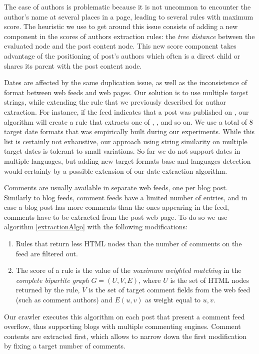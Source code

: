 The case of authors is problematic because it is not uncommon to encounter the author's name at several places in a page, leading to several rules with maximum score. The heuristic we use to get around this issue consists of adding a new component in the scores of authors extraction rules: the \emph{tree distance} between the evaluated node and the post content node. This new score component takes advantage of the positioning of post's authors which often is a direct child or shares its parent with the post content node.

Dates are affected by the same duplication issue, as well as the inconsistence of format between web feeds and web pages. Our solution is to use multiple \emph{target} strings, while extending the rule that we previously described for author extraction. For instance, if the feed indicates that a post was published on
, our algorithm will create a rule that extracts one of , ,  and so on. We use a total of 8 target date formats that was empirically built during our experiments. While this list is certainly not exhaustive, our approach using string similarity on multiple target dates is tolerant to small variations. So far we do not support dates in multiple languages, but adding new target formats base and languages detection would certainly by a possible extension of our date extraction algorithm.

Comments are usually available in separate web feeds, one per blog post. Similarly to blog feeds, comment feeds have a limited number of entries, and in case a blog post has more comments than the ones appearing in the feed, comments have to be extracted from the post web page. To do so we use algorithm \ref{extractionAlgo} with the following modifications:
\begin{enumerate}
  \item Rules that return less HTML nodes than the number of comments on the feed are filtered out.
  \item The score of a rule is the value of the \emph{maximum weighted matching} in the \emph{complete bipartite graph} $G = (U, V, E)$, where $U$ is the set of HTML nodes returned by the rule, $V$ is the set of target comment fields from the web feed (such as comment authors) and $E(u, v)$ as weight equal to \code{\ref{similarityAlgo}(}$u, v$\code{)}.
\end{enumerate}
Our crawler executes this algorithm on each post that present a comment feed overflow, thus supporting blogs with multiple commenting engines. Comment contents are extracted first, which allows to narrow down the first modification by fixing a target number of comments.
